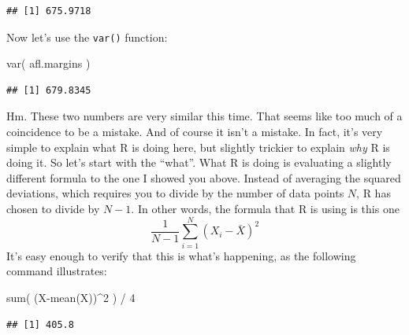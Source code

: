 \documentclass[
]{book}
\newenvironment{Shaded}{\begin{snugshade}}{\end{snugshade}}
\newcommand{\DecValTok}[1]{\textcolor[rgb]{0.00,0.00,0.81}{#1}}
\newcommand{\FunctionTok}[1]{\textcolor[rgb]{0.00,0.00,0.00}{#1}}
\newcommand{\NormalTok}[1]{#1}
\newcommand{\SpecialCharTok}[1]{\textcolor[rgb]{0.00,0.00,0.00}{#1}}
\begin{document}
\begin{verbatim}
## [1] 675.9718
\end{verbatim}

Now let's use the \texttt{var()} function:

\begin{Shaded}
\begin{Highlighting}[]
\FunctionTok{var}\NormalTok{( afl.margins )}
\end{Highlighting}
\end{Shaded}

\begin{verbatim}
## [1] 679.8345
\end{verbatim}

Hm. These two numbers are very similar this time. That seems like too much of a coincidence to be a mistake. And of course it isn't a mistake. In fact, it's very simple to explain what R is doing here, but slightly trickier to explain \emph{why} R is doing it. So let's start with the ``what''. What R is doing is evaluating a slightly different formula to the one I showed you above. Instead of averaging the squared deviations, which requires you to divide by the number of data points \(N\), R has chosen to divide by \(N-1\). In other words, the formula that R is using is this one\\
\[
\frac{1}{N-1} \sum_{i=1}^N \left( X_i - \bar{X} \right)^2
\]
It's easy enough to verify that this is what's happening, as the following command illustrates:

\begin{Shaded}
\begin{Highlighting}[]
\FunctionTok{sum}\NormalTok{( (X}\SpecialCharTok{{-}}\FunctionTok{mean}\NormalTok{(X))}\SpecialCharTok{\^{}}\DecValTok{2}\NormalTok{ ) }\SpecialCharTok{/} \DecValTok{4}
\end{Highlighting}
\end{Shaded}

\begin{verbatim}
## [1] 405.8
\end{verbatim}
\end{document}
